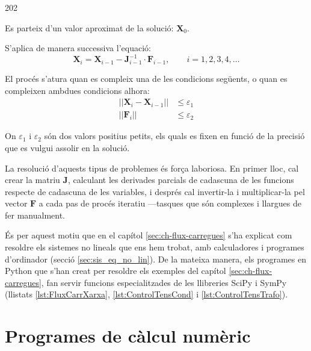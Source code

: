 \begin{dingautolist}{202}
	\item Es parteix d'un valor aproximat de la solució: $\boldsymbol{X}_0$.
	
	\item   S'aplica de manera successiva l'equació:
	\begin{equation}
		\boldsymbol{X}_i = \boldsymbol{X}_{i-1} - \boldsymbol{J}_{i-1}^{-1} \cdot \boldsymbol{F}_{i-1}, \qquad i=1,2,3,4, \dots
	\end{equation}
	
	\item   El procés s'atura quan es compleix una de les condicions següents, o quan es compleixen ambdues condicions alhora:
	\begin{subequations}\begin{align}
			||\boldsymbol{X}_i - \boldsymbol{X}_{i-1}|| &\leq \varepsilon_1 \\
			||\boldsymbol{F}_i|| &\leq \varepsilon_2
	\end{align}\end{subequations}
	
	On $\varepsilon_1$ i $\varepsilon_2$ són dos valors positius petits, els quals es fixen en funció de la precisió que es vulgui assolir en la solució.
\end{dingautolist}

La resolució d'aquests tipus de problemes és força laboriosa. En primer lloc, cal crear la matriu  $\boldsymbol{J}$, calculant les derivades parcials de cadascuna de les funcions respecte de cadascuna de les variables, i després  cal invertir-la i multiplicar-la pel vector $\boldsymbol{F}$ a cada pas de procés iteratiu ---tasques que són  complexes i llargues  de fer manualment.

És per aquest motiu que en el capítol \ref{sec:ch-flux-carregues}  s'ha explicat com resoldre els sistemes no lineals que ens hem trobat, amb calculadores i programes d'ordinador (secció \ref{sec:sis_eq_no_lin}). De la mateixa manera, els programes en Python que s'han creat  per resoldre els exemples del capítol \ref{sec:ch-flux-carregues},  fan servir funcions especialitzades de les llibreries SciPy i SymPy (llistats \ref{lst:FluxCarrXarxa}, \ref{lst:ControlTensCond} i \ref{lst:ControlTensTrafo}). 


\section{Programes de càlcul numèric}\label{sec:calcul-numeric}

